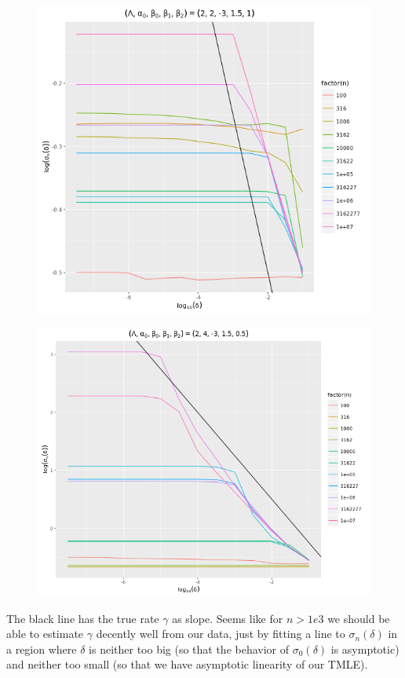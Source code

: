 \documentclass[a4paper]{article}
\begin{document}
\begin{figure}[!htbp]
   \includegraphics[scale = 0.4]{sigm_n(delta)-hard-tp.png}
\end{figure}

\begin{figure}[!htbp]
   \includegraphics[scale = 0.35]{sigm_n(delta)-easy-tp.png}
\end{figure}

The black line has the true rate $\gamma$ as slope. Seems like for $n > 1e3$ we should be able to estimate $\gamma$ decently well from our data, just by fitting a line to $\sigma_n(\delta)$ in a region where $\delta$ is neither too big (so that the behavior of $\sigma_0(\delta)$ is asymptotic) and neither too small (so that we have asymptotic linearity of our TMLE).
\end{document}
